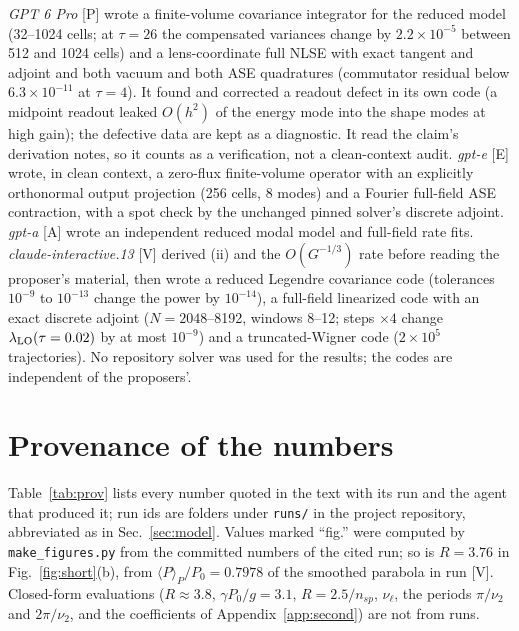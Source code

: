 \documentclass[aps,pra,twocolumn,superscriptaddress,nofootinbib,floatfix]{revtex4-2}
\newcommand{\nsp}{n_{sp}}
\newcommand{\lamLO}{\lambda_{\rm LO}}
\newcommand{\rk}[1]{[\textsf{#1}]}
\begin{document}
\textit{GPT 6 Pro} \rk{P} wrote a finite-volume covariance integrator for the reduced model (32--1024 cells; at $\tau=26$ the
compensated variances change by $2.2\times10^{-5}$ between 512 and 1024 cells) and a lens-coordinate full NLSE with exact
tangent and adjoint and both vacuum and both ASE quadratures (commutator residual below $6.3\times10^{-11}$ at $\tau=4$). It
found and corrected a readout defect in its own code (a midpoint readout leaked $O(h^2)$ of the energy mode into the shape
modes at high gain); the defective data are kept as a diagnostic. It read the claim's derivation notes, so it counts as a
verification, not a clean-context audit. \textit{gpt-e} \rk{E} wrote, in clean context, a zero-flux finite-volume
operator with an explicitly orthonormal output projection (256 cells, 8 modes) and a Fourier full-field ASE contraction,
with a spot check by the unchanged pinned solver's discrete adjoint. \textit{gpt-a} \rk{A} wrote an independent reduced
modal model and full-field rate fits. \textit{claude-interactive.13} \rk{V} derived (ii) and the $O(G^{-1/3})$ rate before
reading the proposer's material, then wrote a reduced Legendre covariance code (tolerances $10^{-9}$ to $10^{-13}$ change the
power by $10^{-14}$), a full-field linearized code with an exact discrete adjoint ($N=2048$--8192, windows 8--12; steps $\times4$
change $\lamLO(\tau=0.02)$ by at most $10^{-9}$) and a truncated-Wigner code ($2\times10^5$ trajectories). No repository
solver was used for the results; the codes are independent of the proposers'.

\section{Provenance of the numbers}\label{app:prov}

Table~\ref{tab:prov} lists every number quoted in the text with its run and the agent that produced it; run ids are folders
under \texttt{runs/} in the project repository, abbreviated as in Sec.~\ref{sec:model}. Values marked ``fig.'' were computed
by \texttt{make\_figures.py} from the committed numbers of the cited run; so is $R=3.76$ in Fig.~\ref{fig:short}(b), from
$\langle P\rangle_P/P_0=0.7978$ of the smoothed parabola in run \rk{V}. Closed-form evaluations ($R\approx3.8$,
$\gamma P_0/g=3.1$, $R=2.5/\nsp$, $\nu_\ell$, the periods $\pi/\nu_2$ and $2\pi/\nu_2$, and the coefficients of
Appendix~\ref{app:second}) are not from runs.
\end{document}
